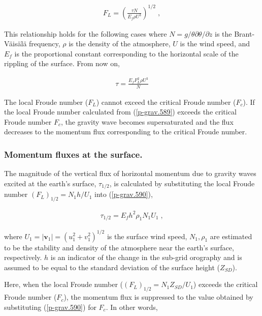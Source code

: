\begin{eqnarray}
   F_L = \left(
            \frac{\tau N}{E_f \rho U^3}
           \right)^{1/2} \; , \label{p-grav.589}
\end{eqnarray}

This relationship holds for the following cases where
\(N = g/\theta \partial \theta/\partial z\) is the Brant-Väisälä
frequency, \(\rho\) is the density of the atmosphere, \(U\) is the wind
speed, and \(E_f\) is the proportional constant corresponding to the
horizontal scale of the rippling of the surface. From now on,

\begin{eqnarray}
  \tau = \frac{E_f F_L^2 \rho U^3}{N} \label{p-grav.590}
\end{eqnarray}

The local Froude number (\(F_L\)) cannot exceed the critical Froude
number (\(F_{c}\)). If the local Froude number calculated from
(\ref{p-grav.589}) exceeds the critical Froude number \(F_{c}\),
the gravity wave becomes supersaturated and the flux decreases to the
momentum flux corresponding to the critical Froude number.

\hypertarget{momentum-fluxes-at-the-surface.}{%
\subsubsection{Momentum fluxes at the
surface.}\label{momentum-fluxes-at-the-surface.}}

The magnitude of the vertical flux of horizontal momentum due to gravity
waves excited at the earth's surface, \(\tau_{1/2}\), is calculated by
substituting the local Froude number \((F_L)_{1/2} = N_1 h/U_1\) into
(\ref{p-grav.590}),

\begin{eqnarray}
  \tau_{1/2} = E_f h^2 \rho_1 N_1 U_1 \; ,
\end{eqnarray}

where \(U_1 = |{\mathbf v}_1| = (u_1^2 + v_1^2)^{1/2}\) is the surface
wind speed, \(N_1, \rho_1\) are estimated to be the stability and
density of the atmosphere near the earth's surface, respectively. \(h\)
is an indicator of the change in the sub-grid orography and is assumed
to be equal to the standard deviation of the surface height
(\(Z_{SD}\)).

Here, when the local Froude number (\((F_L)_{1/2} = N_1 Z_{SD}/U_1\))
exceeds the critical Froude number (\(F_c\)), the momentum flux is
suppressed to the value obtained by substituting
(\ref{p-grav.590}) for \(F_c\). In other words,

